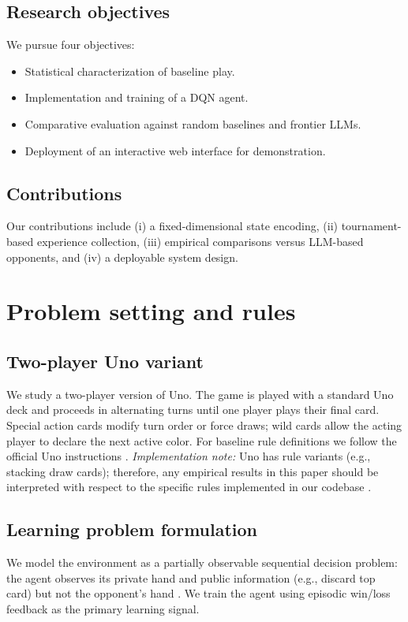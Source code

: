 \documentclass[11pt]{article}
\begin{document}
\subsection{Research objectives}
We pursue four objectives:
\begin{itemize}
  \item Statistical characterization of baseline play.
  \item Implementation and training of a DQN agent.
  \item Comparative evaluation against random baselines and frontier LLMs.
  \item Deployment of an interactive web interface for demonstration.
\end{itemize}

\subsection{Contributions}
Our contributions include (i) a fixed-dimensional state encoding, (ii) tournament-based experience collection, (iii) empirical comparisons versus LLM-based opponents, and (iv) a deployable system design.

\section{Problem setting and rules}
\subsection{Two-player Uno variant}
We study a two-player version of Uno. The game is played with a standard Uno deck and proceeds in alternating turns until one player plays their final card. Special action cards modify turn order or force draws; wild cards allow the acting player to declare the next active color. For baseline rule definitions we follow the official Uno instructions \parencite{mattel_uno_rules}. \emph{Implementation note:} Uno has rule variants (e.g., stacking draw cards); therefore, any empirical results in this paper should be interpreted with respect to the specific rules implemented in our codebase \parencite{policyuno_repo}.

\subsection{Learning problem formulation}
We model the environment as a partially observable sequential decision problem: the agent observes its private hand and public information (e.g., discard top card) but not the opponent's hand \parencite{kaelbling1998pomdp}. We train the agent using episodic win/loss feedback as the primary learning signal.
\end{document}
